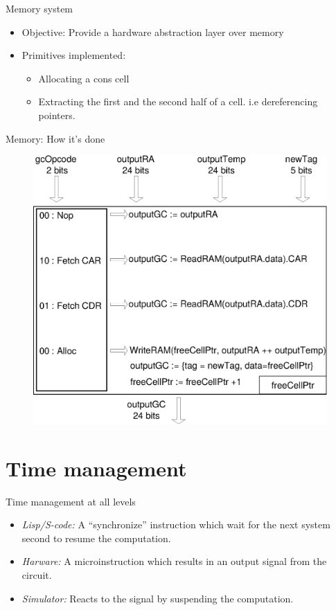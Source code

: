 \documentclass{beamer}
\begin{document}
\begin{frame}{Memory system}
\begin{itemize}
\item Objective: Provide a hardware abstraction layer over memory
\item Primitives implemented:
\begin{itemize}
\item Allocating a cons cell
\item Extracting the first and the second half of a cell. i.e dereferencing
pointers.
\end{itemize}   
\end{itemize}
\end{frame}

\begin{frame}{Memory: How it's done}
\begin{figure}[h]
\center
\includegraphics[scale=0.40]{GC.eps}
\end{figure}
\end{frame}


\section{Time management}

\begin{frame}{Time management at all levels}
\begin{itemize}
\item \emph{Lisp/S-code:} A \enquote{synchronize} instruction which wait for the next
system second to resume the computation.
\item \emph{Harware:} A microinstruction which results in an output signal from
the circuit.
\item \emph{Simulator:} Reacts to the signal by suspending the computation. 
\end{itemize}
\end{frame}
\end{document}
